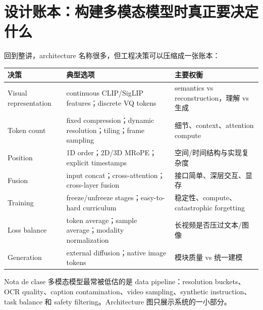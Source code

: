 \section{设计账本：构建多模态模型时真正要决定什么}

回到整讲，architecture 名称很多，但工程决策可以压缩成一张账本：

\begin{longtable}{L{0.18\textwidth}L{0.34\textwidth}L{0.38\textwidth}}
\toprule
决策 & 典型选项 & 主要权衡 \\
\midrule
Visual representation & continuous CLIP/SigLIP features；discrete VQ tokens & semantics vs reconstruction，理解 vs 生成 \\
Token count & fixed compression；dynamic resolution；tiling；frame sampling & 细节、context、attention compute \\
Position & 1D order；2D/3D MRoPE；explicit timestamps & 空间/时间结构与实现复杂度 \\
Fusion & input concat；cross-attention；cross-layer fusion & 接口简单、深层交互、显存 \\
Training & freeze/unfreeze stages；easy-to-hard curriculum & 稳定性、compute、catastrophic forgetting \\
Loss balance & token average；sample average；modality normalization & 长视频是否压过文本/图像 \\
Generation & external diffusion；native image tokens & 模块质量 vs 统一建模 \\
\bottomrule
\end{longtable}

\begin{knowledgebox}{Nota de clase}
多模态模型最常被低估的是 data pipeline：resolution buckets、OCR quality、caption contamination、video sampling、synthetic instruction、task balance 和 safety filtering。Architecture 图只展示系统的一小部分。
\end{knowledgebox}

